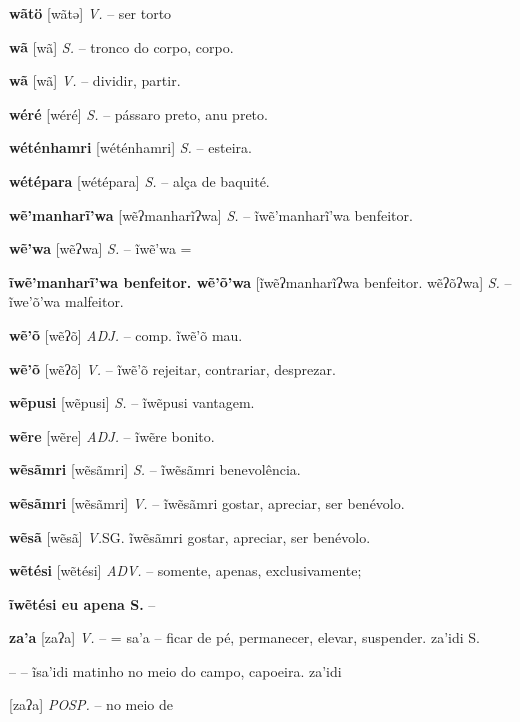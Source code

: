{{{{{{{{{{{{{\textbf{wãtö} [wãtə] \textit{V.} -- {ser torto}

\textbf{wã} [wã] \textit{S.} -- tronco do corpo, corpo.

\textbf{wã} [wã] \textit{V.} -- dividir, partir.

\textbf{wéré} [wéré] \textit{S.} -- pássaro preto, anu preto.

\textbf{wéténhamri} [wéténhamri] \textit{S.} -- esteira.

\textbf{wétépara} [wétépara] \textit{S.} -- alça de baquité.

\textbf{wẽ'manharĩ'wa} [wẽʔmanharĩʔwa] \textit{S.} -- ĩwẽ'manharĩ'wa benfeitor.

\textbf{wẽ'wa} [wẽʔwa] \textit{S.} -- ĩwẽ'wa =

\textbf{ĩwẽ'manharĩ'wa benfeitor. wẽ'õ'wa} [ĩwẽʔmanharĩʔwa benfeitor. wẽʔõʔwa] \textit{S.} -- ĩwe'õ'wa malfeitor.

\textbf{wẽ'õ} [wẽʔõ] \textit{ADJ.} -- comp. ĩwẽ'õ mau.

\textbf{wẽ'õ} [wẽʔõ] \textit{V.} -- ĩwẽ'õ rejeitar, contrariar, desprezar.

\textbf{wẽpusi} [wẽpusi] \textit{S.} -- ĩwẽpusi vantagem.

\textbf{wẽre} [wẽre] \textit{ADJ.} -- ĩwẽre bonito.

\textbf{wẽsãmri} [wẽsãmri] \textit{S.} -- ĩwẽsãmri benevolência.

\textbf{wẽsãmri} [wẽsãmri] \textit{V.} -- ĩwẽsãmri gostar, apreciar, ser benévolo.

\textbf{wẽsã} [wẽsã] \textit{V.}SG. ĩwẽsãmri gostar, apreciar, ser benévolo.

\textbf{wẽtési} [wẽtési] \textit{ADV.} -- somente, apenas, exclusivamente;

\textbf{ĩwẽtési eu apena S.} -- \n%

\textbf{za'a} [zaʔa] \textit{V.} -- = sa'a -- ficar de pé, permanecer, elevar, suspender. za'idi S.} -- -- ĩsa'idi matinho no meio do campo, capoeira. za'idi} [zaʔa] \textit{POSP.} -- no meio de

}}}}}}}}}}}
